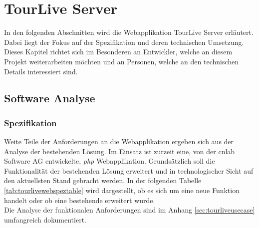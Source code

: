 \chapter{TourLive Server}
\label{sec:tourliveserver}
In den folgenden Abschnitten wird die Webapplikation TourLive Server erläutert. Dabei liegt der Fokus auf der Spezifikation und deren technischen Umsetzung. Dieses Kapitel richtet sich im Besonderen an Entwickler, welche an diesem Projekt weiterarbeiten möchten und an Personen, welche an den technischen Details interessiert sind.

\section{Software Analyse}
\subsection{Spezifikation}
Weite Teile der Anforderungen an die Webapplikation ergeben sich aus der Analyse der bestehenden Lösung. Im Einsatz ist zurzeit eine, von der cnlab Software AG entwickelte, \textit{\gls{php}} Webapplikation. Grundsätzlich soll die Funktionalität der bestehenden Lösung erweitert und in technologischer Sicht auf den aktuellsten Stand gebracht werden. In der folgenden Tabelle \ref{tab:tourlivewebspeztable} wird dargestellt, ob es sich um eine neue Funktion handelt oder ob eine bestehende erweitert wurde.
\\

Die Analyse der funktionalen Anforderungen sind im Anhang \ref{sec:tourliveusecase} umfangreich dokumentiert.

